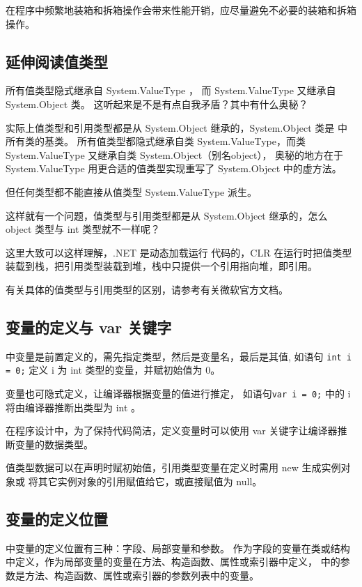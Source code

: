 在程序中频繁地装箱和拆箱操作会带来性能开销，应尽量避免不必要的装箱和拆箱操作。

\subsection{延伸阅读值类型}
所有值类型隐式继承自 System.ValueType ， 而 System.ValueType 又继承自 System.Object 类。
这听起来是不是有点自我矛盾？其中有什么奥秘？

实际上值类型和引用类型都是从 System.Object 继承的，System.Object 类是 \cs 中所有类的基类。
所有值类型都隐式继承自类 System.ValueType，而类 System.ValueType 又继承自类 System.Object（别名object），
奥秘的地方在于 System.ValueType 用更合适的值类型实现重写了 System.Object 中的虚方法。

但任何类型都不能直接从值类型 System.ValueType 派生。

这样就有一个问题，值类型与引用类型都是从 System.Object 继承的，怎么 object 类型与 int 类型就不一样呢？

这里大致可以这样理解，.NET 是动态加载运行 \cs 代码的，CLR 在运行时把值类型装载到栈，把引用类型装载到堆，栈中只提供一个引用指向堆，即引用。

有关具体的值类型与引用类型的区别，请参考有关微软官方文档。

\subsection{变量的定义与 var 关键字}

\cs 中变量是前置定义的，需先指定类型，然后是变量名，最后是其值,
如语句 \verb|int i = 0;| 定义 i 为 int 类型的变量，并赋初始值为 0。

变量也可隐式定义，让编译器根据变量的值进行推定，
如语句\verb|var i = 0;| 中的 i 将由编译器推断出类型为 int 。

在程序设计中，为了保持代码简洁，定义变量时可以使用 var 关键字让编译器推断变量的数据类型。

值类型数据可以在声明时赋初始值，引用类型变量在定义时需用 new 生成实例对象或
将其它实例对象的引用赋值给它，或直接赋值为 null。

\subsection{变量的定义位置}
\cs 中变量的定义位置有三种：字段、局部变量和参数。
作为字段的变量在类或结构中定义，作为局部变量的变量在方法、构造函数、属性或索引器中定义，
\cs 中的参数是方法、构造函数、属性或索引器的参数列表中的变量。

